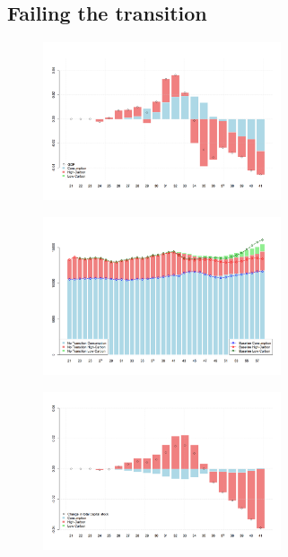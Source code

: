 \documentclass[authoryear]{article}
\begin{document}
\subsection{Failing the transition}
\label{sec:notrans}
\begin{figure}[h!]
\begin{minipage}[b]{.5\linewidth}
\centering\large 
  \includegraphics[width=7cm]{Figures/NoTransitionGDP.png}
  \label{Fig:NoTransGDP}
\end{minipage}%
  \quad \quad 
\begin{minipage}[b]{.5\linewidth}
\centering\large 
    \includegraphics[width=7cm]{Figures/NoTransitionGDP2.png}
    \label{Fig:NoTransGDP2}
\end{minipage}
\vspace{0.2cm}
    \begin{minipage}[b]{.5\linewidth}
\centering\large 
   \includegraphics[width=7cm]{Figures/NoTransitionKStock.png}
    \label{Fig:NoTransK}
\end{minipage}

\end{figure}
\end{document}
